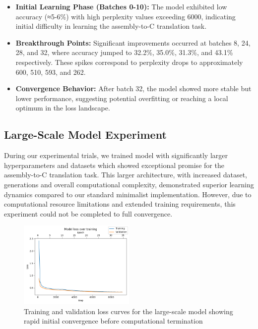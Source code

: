 \documentclass[../main.tex]{subfiles}
\begin{document}
\begin{itemize}
\item \textbf{Initial Learning Phase (Batches 0-10):} The model exhibited low accuracy (≈5-6\%) with high perplexity values exceeding 6000, indicating initial difficulty in learning the assembly-to-C translation task.

\item \textbf{Breakthrough Points:} Significant improvements occurred at batches 8, 24, 28, and 32, where accuracy jumped to 32.2\%, 35.0\%, 31.3\%, and 43.1\% respectively. These spikes correspond to perplexity drops to approximately 600, 510, 593, and 262.

\item \textbf{Convergence Behavior:} After batch 32, the model showed more stable but lower performance, suggesting potential overfitting or reaching a local optimum in the loss landscape.
\end{itemize}

\subsection{Large-Scale Model Experiment}

During our experimental trials, we trained model with significantly larger hyperparameters and datasets which showed exceptional promise for the assembly-to-C translation task. This larger architecture, with increased dataset, generations and overall computational complexity, demonstrated superior learning dynamics compared to our standard minimalist implementation. However, due to computational resource limitations and extended training requirements, this experiment could not be completed to full convergence.

\begin{figure}[htbp]
\centering
\includegraphics[width=0.5\textwidth]{images/loss_per_step.png}
\caption{Training and validation loss curves for the large-scale model showing rapid initial convergence before computational termination}
\label{fig:large_model_loss}
\end{figure}
\end{document}
